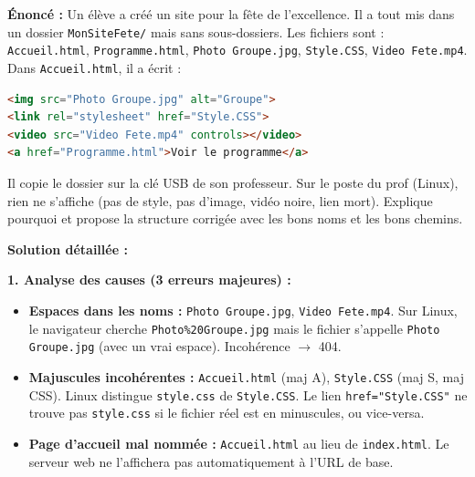 \documentclass[11pt]{article}
\begin{document}
\begin{exoresolu}
\textbf{Énoncé :} Un élève a créé un site pour la fête de l'excellence. Il a tout mis dans un dossier \texttt{MonSiteFete/} mais sans sous-dossiers. Les fichiers sont : \texttt{Accueil.html}, \texttt{Programme.html}, \texttt{Photo Groupe.jpg}, \texttt{Style.CSS}, \texttt{Video Fete.mp4}. Dans \texttt{Accueil.html}, il a écrit :
\begin{lstlisting}[language=HTML]
<img src="Photo Groupe.jpg" alt="Groupe">
<link rel="stylesheet" href="Style.CSS">
<video src="Video Fete.mp4" controls></video>
<a href="Programme.html">Voir le programme</a>
\end{lstlisting}
Il copie le dossier sur la clé USB de son professeur. Sur le poste du prof (Linux), rien ne s'affiche (pas de style, pas d'image, vidéo noire, lien mort). Explique pourquoi et propose la structure corrigée avec les bons noms et les bons chemins.

\textbf{Solution détaillée :}

\noindent\textbf{1. Analyse des causes (3 erreurs majeures) :}
\begin{itemize}
    \item \textbf{Espaces dans les noms :} \texttt{Photo Groupe.jpg}, \texttt{Video Fete.mp4}. Sur Linux, le navigateur cherche \texttt{Photo\%20Groupe.jpg} mais le fichier s'appelle \texttt{Photo Groupe.jpg} (avec un vrai espace). Incohérence $\rightarrow$ 404.
    \item \textbf{Majuscules incohérentes :} \texttt{Accueil.html} (maj A), \texttt{Style.CSS} (maj S, maj CSS). Linux distingue \texttt{style.css} de \texttt{Style.CSS}. Le lien \texttt{href="Style.CSS"} ne trouve pas \texttt{style.css} si le fichier réel est en minuscules, ou vice-versa.
    \item \textbf{Page d'accueil mal nommée :} \texttt{Accueil.html} au lieu de \texttt{index.html}. Le serveur web ne l'affichera pas automatiquement à l'URL de base.
\end{itemize}


\end{exoresolu}
\end{document}
